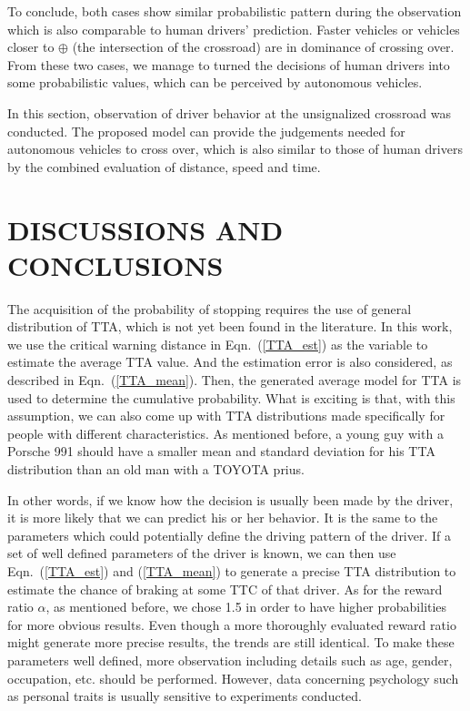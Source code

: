 \documentclass[twocolumn,10pt]{asme2e}
\begin{document}
To conclude, both cases show similar probabilistic pattern during the observation which is also comparable to human drivers' prediction. Faster vehicles or vehicles closer to $\oplus$ (the intersection of the crossroad) are in dominance of crossing over. From these two cases, we manage to turned the decisions of human drivers into some probabilistic values, which can be perceived by autonomous vehicles.  

In this section, observation of driver behavior at the unsignalized crossroad was conducted. The proposed model can provide the judgements needed for autonomous vehicles to cross over, which is also similar to those of human drivers by the combined evaluation of distance, speed and time. 

\section{DISCUSSIONS AND CONCLUSIONS}

The acquisition of the probability of stopping requires the use of general distribution of TTA, which is not yet been found in the literature. In this work, we use the critical warning distance in Eqn.~(\ref{TTA_est}) as the variable to estimate the average TTA value. And the estimation error is also considered, as described in Eqn.~(\ref{TTA_mean}). Then, the generated average model for TTA is used to determine the cumulative probability. What is exciting is that, with this assumption, we can also come up with TTA distributions made specifically for people with different characteristics. As mentioned before, a young guy with a Porsche 991 should have a smaller mean and standard deviation for his TTA distribution than an old man with a TOYOTA prius. 

In other words, if we know how the decision is usually been made by the driver, it is more likely that we can predict his or her behavior. It is the same to the parameters which could potentially define the driving pattern of the driver. If a set of well defined parameters of the driver is known, we can then use Eqn.~(\ref{TTA_est}) and (\ref{TTA_mean}) to generate a precise TTA distribution to estimate the chance of braking at some TTC of that driver. As for the reward ratio $\alpha$, as mentioned before, we chose 1.5 in order to have higher probabilities for more obvious results. Even though a more thoroughly evaluated reward ratio might generate more precise results, the trends are still identical. To make these parameters well defined, more observation including details such as age, gender, occupation, etc. should be performed. However, data concerning psychology such as personal traits is usually sensitive to experiments conducted. 
\end{document}
